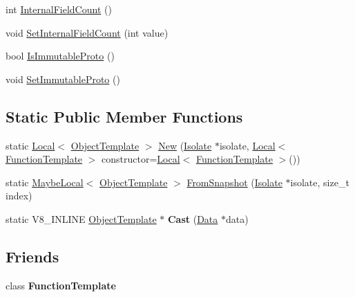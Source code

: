 \begin{DoxyCompactItemize}
\item 
int \mbox{\hyperlink{classv8_1_1ObjectTemplate_a43de785d594d8c01b18230b1aa79e31c}{Internal\+Field\+Count}} ()
\item 
void \mbox{\hyperlink{classv8_1_1ObjectTemplate_ab63916ac584a76bca8ba541f86ce9fce}{Set\+Internal\+Field\+Count}} (int value)
\item 
bool \mbox{\hyperlink{classv8_1_1ObjectTemplate_a76c12ee7be283bd3b007d062686dc0ed}{Is\+Immutable\+Proto}} ()
\item 
void \mbox{\hyperlink{classv8_1_1ObjectTemplate_adba49230a24b42f0985494ac86655e54}{Set\+Immutable\+Proto}} ()
\end{DoxyCompactItemize}
\subsection*{Static Public Member Functions}
\begin{DoxyCompactItemize}
\item 
static \mbox{\hyperlink{classv8_1_1Local}{Local}}$<$ \mbox{\hyperlink{classv8_1_1ObjectTemplate}{Object\+Template}} $>$ \mbox{\hyperlink{classv8_1_1ObjectTemplate_ae0bcd58e9e069c50148c377d774de7a1}{New}} (\mbox{\hyperlink{classv8_1_1Isolate}{Isolate}} $\ast$isolate, \mbox{\hyperlink{classv8_1_1Local}{Local}}$<$ \mbox{\hyperlink{classv8_1_1FunctionTemplate}{Function\+Template}} $>$ constructor=\mbox{\hyperlink{classv8_1_1Local}{Local}}$<$ \mbox{\hyperlink{classv8_1_1FunctionTemplate}{Function\+Template}} $>$())
\item 
static \mbox{\hyperlink{classv8_1_1MaybeLocal}{Maybe\+Local}}$<$ \mbox{\hyperlink{classv8_1_1ObjectTemplate}{Object\+Template}} $>$ \mbox{\hyperlink{classv8_1_1ObjectTemplate_a7899f31276e3ca69358005e360e3bc27}{From\+Snapshot}} (\mbox{\hyperlink{classv8_1_1Isolate}{Isolate}} $\ast$isolate, size\+\_\+t index)
\item 
\mbox{\label{classv8_1_1ObjectTemplate_aba82061a19144380f44994c3e57c6e60}} 
static V8\+\_\+\+I\+N\+L\+I\+NE \mbox{\hyperlink{classv8_1_1ObjectTemplate}{Object\+Template}} $\ast$ {\bfseries Cast} (\mbox{\hyperlink{classv8_1_1Data}{Data}} $\ast$data)
\end{DoxyCompactItemize}
\subsection*{Friends}
\begin{DoxyCompactItemize}
\item 
\mbox{\label{classv8_1_1ObjectTemplate_a334168ad1a5f39cf17b818ca3356aacd}} 
class {\bfseries Function\+Template}
\end{DoxyCompactItemize}


